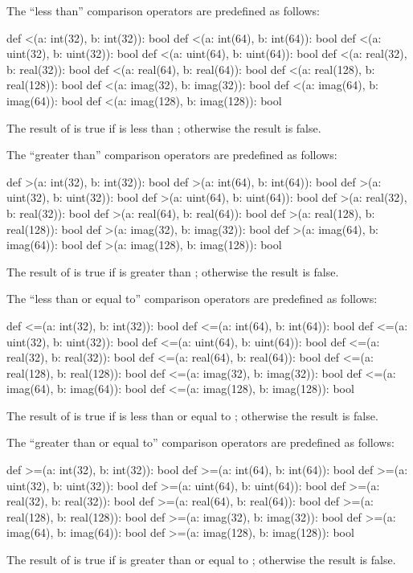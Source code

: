 The ``less than'' comparison operators are predefined as follows:
\begin{chapel}
def <(a: int(32), b: int(32)): bool
def <(a: int(64), b: int(64)): bool
def <(a: uint(32), b: uint(32)): bool
def <(a: uint(64), b: uint(64)): bool
def <(a: real(32), b: real(32)): bool
def <(a: real(64), b: real(64)): bool
def <(a: real(128), b: real(128)): bool
def <(a: imag(32), b: imag(32)): bool
def <(a: imag(64), b: imag(64)): bool
def <(a: imag(128), b: imag(128)): bool
\end{chapel}
The result of  is true if  is less than ;
otherwise the result is false.

The ``greater than'' comparison operators are predefined as follows:
\begin{chapel}
def >(a: int(32), b: int(32)): bool
def >(a: int(64), b: int(64)): bool
def >(a: uint(32), b: uint(32)): bool
def >(a: uint(64), b: uint(64)): bool
def >(a: real(32), b: real(32)): bool
def >(a: real(64), b: real(64)): bool
def >(a: real(128), b: real(128)): bool
def >(a: imag(32), b: imag(32)): bool
def >(a: imag(64), b: imag(64)): bool
def >(a: imag(128), b: imag(128)): bool
\end{chapel}
The result of  is true if  is greater
than ; otherwise the result is false.

The ``less than or equal to'' comparison operators are predefined as
follows:
\begin{chapel}
def <=(a: int(32), b: int(32)): bool
def <=(a: int(64), b: int(64)): bool
def <=(a: uint(32), b: uint(32)): bool
def <=(a: uint(64), b: uint(64)): bool
def <=(a: real(32), b: real(32)): bool
def <=(a: real(64), b: real(64)): bool
def <=(a: real(128), b: real(128)): bool
def <=(a: imag(32), b: imag(32)): bool
def <=(a: imag(64), b: imag(64)): bool
def <=(a: imag(128), b: imag(128)): bool
\end{chapel}
The result of  is true if  is less than or equal
to ; otherwise the result is false.

The ``greater than or equal to'' comparison operators are predefined
as follows:
\begin{chapel}
def >=(a: int(32), b: int(32)): bool
def >=(a: int(64), b: int(64)): bool
def >=(a: uint(32), b: uint(32)): bool
def >=(a: uint(64), b: uint(64)): bool
def >=(a: real(32), b: real(32)): bool
def >=(a: real(64), b: real(64)): bool
def >=(a: real(128), b: real(128)): bool
def >=(a: imag(32), b: imag(32)): bool
def >=(a: imag(64), b: imag(64)): bool
def >=(a: imag(128), b: imag(128)): bool
\end{chapel}
The result of  is true if  is greater than or
equal to ; otherwise the result is false.

